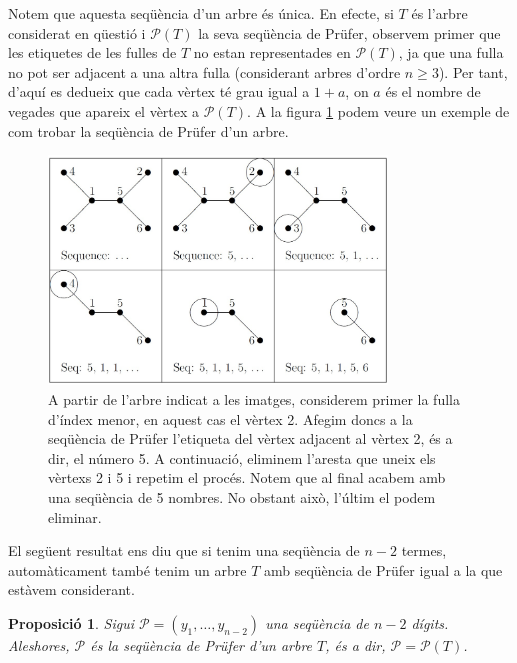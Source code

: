 \documentclass{article}
\newtheorem{prop}{Proposició}[section]
\begin{document}
Notem que aquesta seqüència d'un arbre és única. En efecte, si $T$ és l'arbre considerat en qüestió i $\mathcal{P}(T)$ la seva seqüència de Prüfer, observem primer que les etiquetes de les fulles de $T$ no estan representades en $\mathcal{P}(T)$, ja que una fulla no pot ser adjacent a una altra fulla (considerant arbres d'ordre $n\geq 3$). Per tant, d'aquí es dedueix que cada vèrtex té grau igual a $1+a$, on $a$ és el nombre de vegades que apareix el vèrtex a $\mathcal{P}(T)$. A la figura \ref{pruf1} podem veure un exemple de com trobar la seqüència de Prüfer d'un arbre.\par \begin{figure}[H]
   \centering
   \includegraphics[width=9cm]{imatges/prufer1.jpg}
   \caption{A partir de l'arbre indicat a les imatges, considerem primer la fulla d'índex menor, en aquest cas el vèrtex 2. Afegim doncs a la seqüència de Prüfer l'etiqueta del vèrtex adjacent al vèrtex 2, és a dir, el número 5. A continuació, eliminem l'aresta que uneix els vèrtexs 2 i 5 i repetim el procés. Notem que al final acabem amb una seqüència de 5 nombres. No obstant això, l'últim el podem eliminar. \cite{3}}
   \label{pruf1}
\end{figure}
El següent resultat ens diu que si tenim una seqüència de $n-2$ termes, automàticament també tenim un arbre $T$ amb seqüència de Prüfer igual a la que estàvem considerant.
\begin{prop}
Sigui $\mathcal{P}=(y_1,\ldots,y_{n-2})$ una seqüència de $n-2$ dígits. Aleshores, $\mathcal{P}$ és la seqüència de Prüfer d'un arbre $T$, és a dir, $\mathcal{P}=\mathcal{P}(T)$.
\end{prop}
\end{document}
